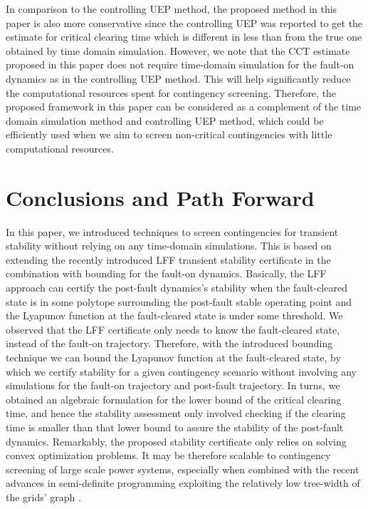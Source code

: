 \documentclass[final]{IEEEtran}
\begin{document}
In comparison to the controlling UEP method, the proposed method
in this paper is also more conservative since the controlling UEP
was reported \cite{Chiang:2011eo} to get the estimate for critical
clearing time which is different in less than  from the true
one obtained by time domain simulation. However, we note that the
CCT estimate proposed in this paper does not require time-domain
simulation for the fault-on dynamics as in the controlling UEP
method. This will help significantly reduce the computational
resources spent for contingency screening. Therefore, the proposed
framework in this paper can be considered as a complement of the
time domain simulation method and controlling UEP method, which
could be efficiently used when we aim to screen non-critical
contingencies with little computational resources.


\section{Conclusions and Path Forward}
\label{sec:discussion}

In this paper, we introduced techniques to screen contingencies
for transient stability without relying on any time-domain
simulations. This is based on extending the recently introduced
LFF transient stability certificate in the combination with
bounding for the fault-on dynamics. Basically, the LFF approach
can certify the post-fault dynamics's stability when the
fault-cleared state is in some polytope surrounding the post-fault
stable operating point and the Lyapunov function at the
fault-cleared state is under some threshold. We observed that the
LFF certificate only needs to know the fault-cleared state,
instead of the fault-on trajectory. Therefore, with the introduced
bounding technique we can bound the Lyapunov function at the
fault-cleared state, by which we certify stability for a given
contingency scenario without involving any simulations for the
fault-on trajectory and post-fault trajectory. In turns, we
obtained an algebraic formulation for the lower bound of the
critical clearing time, and hence the stability assessment only
involved checking if the clearing time is smaller than that lower
bound to assure the stability of the post-fault dynamics.
Remarkably, the proposed stability certificate only relies on
solving convex optimization problems. It may be therefore scalable
to contingency screening of large scale power systems, especially
when combined with the recent advances in semi-definite
programming exploiting the relatively low tree-width of the grids'
graph \cite{Javadmadani2014sdp}.
\end{document}
